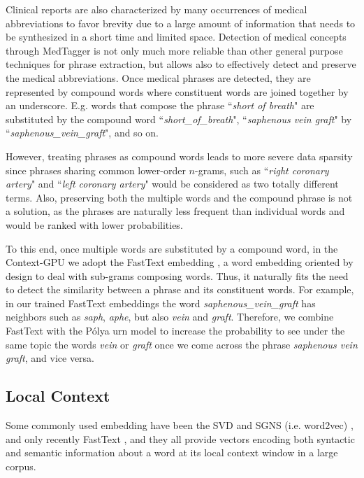 \documentclass[letterpaper]{article}
\begin{document}
Clinical reports are also characterized by many occurrences of medical abbreviations to favor brevity due to a large amount of information that needs to be synthesized in a short time and limited space. Detection of medical concepts through MedTagger is not only much more reliable than other general purpose techniques for phrase extraction, but allows also to effectively detect and preserve the medical abbreviations. 
Once medical phrases are detected, they are represented by compound words where constituent words are joined together by an underscore. E.g. words that compose the phrase ``\textit{short of breath}" are substituted by the compound word ``\textit{short\_of\_breath}", ``\textit{saphenous vein graft}" by ``\textit{saphenous\_vein\_graft}", and so on.  

However, treating phrases as compound words leads to more severe data sparsity since phrases sharing common lower-order $n$-grams, such as ``\emph{right coronary artery}" and ``\emph{left coronary artery}" would be considered as two totally different terms. %
Also, preserving both the multiple words and the compound phrase is not a solution, as the phrases are naturally less frequent than individual words and would be ranked with lower probabilities.

To this end, once multiple words are substituted by a compound word, in the Context-GPU we adopt the FastText embedding \cite{Joulin16}, a word embedding oriented by design to deal with sub-grams composing words. Thus, it naturally fits the need to detect the similarity between a phrase and its constituent words. For example, in our trained FastText embeddings the word \textit{saphenous\_vein\_graft} has neighbors such as \textit{saph}, \textit{aphe}, but also \textit{vein} and \textit{graft}. 
Therefore, we combine FastText with the P\'{o}lya urn model to increase the probability to see under the same topic the words \textit{vein} or \textit{graft} once we come across the phrase \textit{saphenous vein graft}, and vice versa.



\subsection{Local Context}
Some commonly used embedding have been the SVD \cite{Levy15} and SGNS (i.e. word2vec) \cite{Mikolov13a}, and only recently FastText \cite{Joulin16}, and they all provide vectors encoding both syntactic and semantic information about a word at its local context window in a large corpus.
\end{document}
